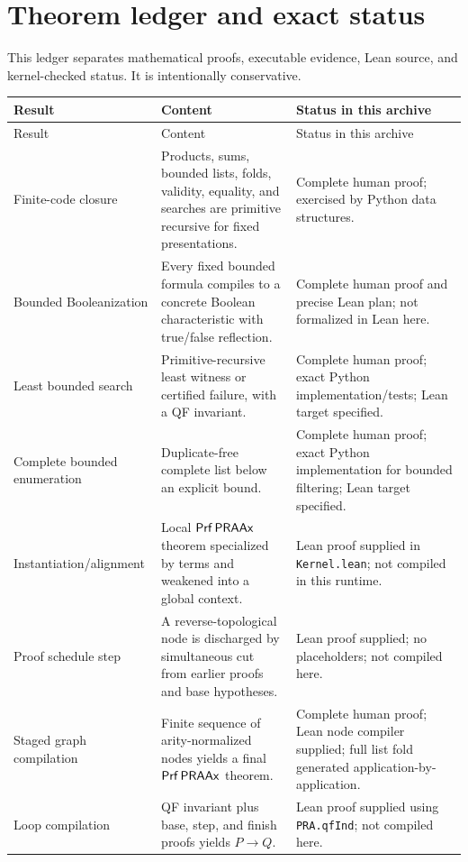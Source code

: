 \section{Theorem ledger and exact status}
\label{sec:ledger}

This ledger separates mathematical proofs, executable evidence, Lean source, and kernel-checked status.  It
is intentionally conservative.

\begin{longtable}{@{}p{}p{}p{}@{}}
\toprule
Result & Content & Status in this archive \\
\midrule
\endfirsthead
\toprule
Result & Content & Status in this archive \\
\midrule
\endhead
Finite-code closure & Products, sums, bounded lists, folds, validity, equality, and searches are primitive recursive for fixed presentations. & Complete human proof; exercised by Python data structures. \\
Bounded Booleanization & Every fixed bounded formula compiles to a concrete Boolean characteristic with true/false reflection. & Complete human proof and precise Lean plan; not formalized in Lean here. \\
Least bounded search & Primitive-recursive least witness or certified failure, with a QF invariant. & Complete human proof; exact Python implementation/tests; Lean target specified. \\
Complete bounded enumeration & Duplicate-free complete list below an explicit bound. & Complete human proof; exact Python implementation for bounded filtering; Lean target specified. \\
Instantiation/alignment & Local \(\mathsf{Prf}\,\mathsf{PRAAx}\) theorem specialized by terms and weakened into a global context. & Lean proof supplied in \texttt{Kernel.lean}; not compiled in this runtime. \\
Proof schedule step & A reverse-topological node is discharged by simultaneous cut from earlier proofs and base hypotheses. & Lean proof supplied; no placeholders; not compiled here. \\
Staged graph compilation & Finite sequence of arity-normalized nodes yields a final \(\mathsf{Prf}\,\mathsf{PRAAx}\) theorem. & Complete human proof; Lean node compiler supplied; full list fold generated application-by-application. \\
Loop compilation & QF invariant plus base, step, and finish proofs yields \(P\to Q\). & Lean proof supplied using \texttt{PRA.qfInd}; not compiled here. \\

\end{longtable}
